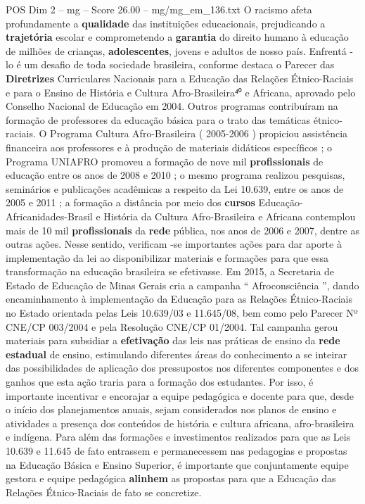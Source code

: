 \begin{textsample}{POS Dim 2 – mg – Score 26.00 – mg/mg\_em\_136.txt}
O racismo afeta profundamente a \textbf{qualidade} das instituições educacionais, prejudicando a \textbf{trajetória} escolar e comprometendo a \textbf{garantia} do direito humano à educação de milhões de crianças, \textbf{adolescentes}, jovens e adultos de nosso país.
Enfrentá -lo é um desafio de toda sociedade brasileira, conforme destaca o Parecer das \textbf{Diretrizes} Curriculares Nacionais para a Educação das Relações Étnico-Raciais e para o Ensino de História e Cultura Afro-Brasileira⁴⁰ e Africana, aprovado pelo Conselho Nacional de Educação em 2004.
Outros programas contribuíram na formação de professores da educação básica para o trato das temáticas étnico-raciais.
O Programa Cultura Afro-Brasileira ( 2005-2006 ) propiciou assistência financeira aos professores e à produção de materiais didáticos específicos ; o Programa UNIAFRO promoveu a formação de nove mil \textbf{profissionais} de educação entre os anos de 2008 e 2010 ; o mesmo programa realizou pesquisas, seminários e publicações acadêmicas a respeito da Lei 10.639, entre os anos de 2005 e 2011 ; a formação a distância por meio dos \textbf{cursos} Educação-Africanidades-Brasil e História da Cultura Afro-Brasileira e Africana contemplou mais de 10 mil \textbf{profissionais} da \textbf{rede} pública, nos anos de 2006 e 2007, dentre as outras ações.
Nesse sentido, verificam -se importantes ações para dar aporte à implementação da lei ao disponibilizar materiais e formações para que essa transformação na educação brasileira se efetivasse.
Em 2015, a Secretaria de Estado de Educação de Minas Gerais cria a campanha “ Afroconsciência ”, dando encaminhamento à implementação da Educação para as Relações Étnico-Raciais no Estado orientada pelas Leis 10.639/03 e 11.645/08, bem como pelo Parecer Nº CNE/CP 003/2004 e pela Resolução CNE/CP 01/2004.
Tal campanha gerou materiais para subsidiar a \textbf{efetivação} das leis nas práticas de ensino da \textbf{rede} \textbf{estadual} de ensino, estimulando diferentes áreas do conhecimento a se inteirar das possibilidades de aplicação dos pressupostos nos diferentes componentes e dos ganhos que esta ação traria para a formação dos estudantes.
Por isso, é importante incentivar e encorajar a equipe pedagógica e docente para que, desde o início dos planejamentos anuais, sejam considerados nos planos de ensino e atividades a presença dos conteúdos de história e cultura africana, afro-brasileira e indígena.
Para além das formações e investimentos realizados para que as Leis 10.639 e 11.645 de fato entrassem e permanecessem nas pedagogias e propostas na Educação Básica e Ensino Superior, é importante que conjuntamente equipe gestora e equipe pedagógica \textbf{alinhem} as propostas para que a Educação das Relações Étnico-Raciais de fato se concretize.

\end{textsample}
